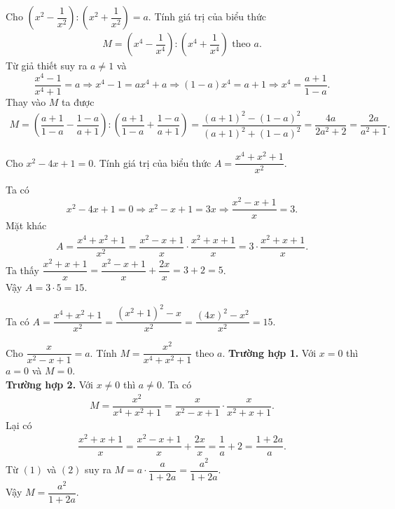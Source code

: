\begin{bt}%
 Cho $\left(x^2-\dfrac{1}{x^2}\right) : \left(x^2+\dfrac{1}{x^2}\right) = a$. Tính giá trị của biểu thức
 \begin{eqnarray*}
  M = \left(x^4-\dfrac{1}{x^4}\right) : \left(x^4+\dfrac{1}{x^4}\right) \text{ theo } a.
 \end{eqnarray*}
 \loigiai
  {
  Từ giả thiết suy ra $a\neq 1$ và
  \[\dfrac{x^4-1}{x^4+1}=a \Rightarrow x^4-1=ax^4+a \Rightarrow (1-a)x^4=a+1 \Rightarrow x^4 = \dfrac{a+1}{1-a}.\]
  Thay vào $M$ ta được
  \allowdisplaybreaks
  \begin{eqnarray*}
   M = \left(\dfrac{a+1}{1-a} - \dfrac{1-a}{a+1}\right) : \left(\dfrac{a+1}{1-a} + \dfrac{1-a}{a+1}\right) = \dfrac{(a+1)^2-(1-a)^2}{(a+1)^2+(1-a)^2} = \dfrac{4a}{2a^2+2} = \dfrac{2a}{a^2+1}.
  \end{eqnarray*}
  }
\end{bt}

\begin{bt}%
 Cho $x^2-4x+1=0$. Tính giá trị của biểu thức $A=\dfrac{x^4+x^2+1}{x^2}$.
 \loigiai
  {
   Ta có \[x^2-4x+1=0 \Rightarrow x^2-x+1=3x \Rightarrow \dfrac{x^2-x+1}{x}=3.\]
  Mặt khác
  \begin{eqnarray*}
   A = \dfrac{x^4+x^2+1}{x^2} = \dfrac{x^2-x+1}{x} \cdot \dfrac{x^2+x+1}{x} = 3 \cdot \dfrac{x^2+x+1}{x}.
  \end{eqnarray*}
  Ta thấy $\dfrac{x^2+x+1}{x} = \dfrac{x^2-x+1}{x}+\dfrac{2x}{x} = 3+2=5$.\\
  Vậy $A = 3 \cdot 5 = 15$.
  
   Ta có $A= \dfrac{x^4+x^2+1}{x^2} = \dfrac{(x^2+1)^2-x}{x^2} = \dfrac{(4x)^2-x^2}{x^2}=15$.
  }
\end{bt}

\begin{bt}%
 Cho $\dfrac{x}{x^2-x+1}=a$. Tính $M=\dfrac{x^2}{x^4+x^2+1}$ theo $a$.
 \loigiai
  {
  {\bf Trường hợp 1.} Với $x=0$ thì $a=0$ và $M=0$.\\
  {\bf Trường hợp 2.} Với $x \neq 0$ thì $a\neq 0$. Ta có
  \begin{align}
   M = \dfrac{x^2}{x^4+x^2+1} = \dfrac{x}{x^2-x+1} \cdot \dfrac{x}{x^2+x+1}. \tag{1}
  \end{align}
  Lại có
  \begin{align}
   \dfrac{x^2+x+1}{x} = \dfrac{x^2-x+1}{x}+\dfrac{2x}{x}=\dfrac{1}{a}+2 = \dfrac{1+2a}{a}. \tag{2}
  \end{align}
  Từ $(1)$ và $(2)$ suy ra $M= a \cdot \dfrac{a}{1+2a} = \dfrac{a^2}{1+2a}$.\\
  Vậy $M=\dfrac{a^2}{1+2a}$.
  }
\end{bt}

